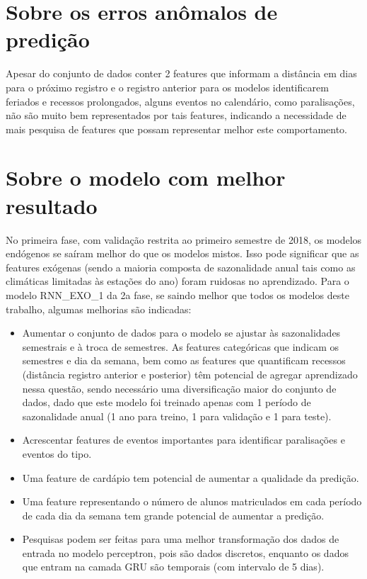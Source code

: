     \section{Sobre os erros anômalos de predição}
        Apesar do conjunto de dados conter 2 features que informam a distância em dias para o próximo registro e o registro anterior para os modelos identificarem feriados e recessos prolongados, alguns eventos no calendário, como paralisações, não são muito bem representados por tais features, indicando a necessidade de mais pesquisa de features que possam representar melhor este comportamento.

    \section{Sobre o modelo com melhor resultado}
        No primeira fase, com validação restrita ao primeiro semestre de 2018, os modelos endógenos se saíram melhor do que os modelos mistos. Isso pode significar que as features exógenas (sendo a maioria composta de sazonalidade anual tais como as climáticas limitadas às estações do ano) foram ruidosas no aprendizado.
        Para o modelo RNN\_EXO\_1 da 2a fase, se saindo melhor que todos os modelos deste trabalho, algumas melhorias são indicadas:
        \begin{itemize}
            \item Aumentar o conjunto de dados para o modelo se ajustar às sazonalidades semestrais e à troca de semestres. As features categóricas que indicam os semestres e dia da semana, bem como as features que quantificam recessos (distância registro anterior e posterior) têm potencial de agregar aprendizado nessa questão, sendo necessário uma diversificação maior do conjunto de dados, dado que este modelo foi treinado apenas com 1 período de sazonalidade anual (1 ano para treino, 1 para validação e 1 para teste).
            \item Acrescentar features de eventos importantes para identificar paralisações e eventos do tipo.
            \item Uma feature de cardápio tem potencial de aumentar a qualidade da predição.
            \item Uma feature representando o número de alunos matriculados em cada período de cada dia da semana tem grande potencial de aumentar a predição.
            \item Pesquisas podem ser feitas para uma melhor transformação dos dados de entrada no modelo perceptron, pois são dados discretos, enquanto os dados que entram na camada GRU são temporais (com intervalo de 5 dias).
        \end{itemize}
        
